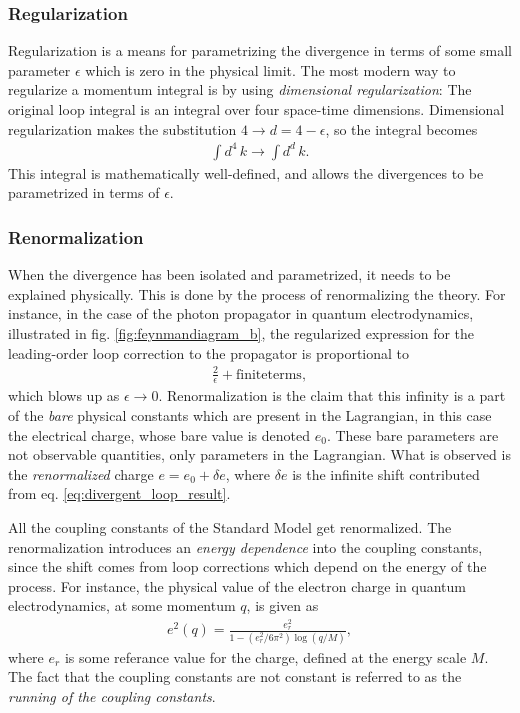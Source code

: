 \subsubsection{Regularization}
Regularization is a means for parametrizing the divergence in terms of some small parameter $\epsilon$ which is zero in the physical limit. The most modern way to regularize a momentum integral is by using {\it dimensional regularization}: The original loop integral is an integral over four space-time dimensions. Dimensional regularization makes the substitution $4 \to d = 4-\epsilon$, so the integral becomes
\begin{align}
	\int d^4 \, k \to \int d^d \, k.
\end{align}
This integral is mathematically well-defined, and allows the divergences to be parametrized in terms of $\epsilon$.
\subsubsection{Renormalization}
When the divergence has been isolated and parametrized, it needs to be explained physically. This is done by the process of renormalizing the theory. For instance, in the case of the photon propagator in quantum electrodynamics, illustrated in fig. \ref{fig:feynmandiagram_b}, the regularized expression for the leading-order loop correction to the propagator is proportional to
\begin{align}
	\frac{2}{\epsilon} + \mathrm{finite terms}, \label{eq:divergent_loop_result}
\end{align}
which blows up as $\epsilon\to 0$. Renormalization is the claim that this infinity is a part of the {\it bare} physical constants which are present in the Lagrangian, in this case the electrical charge, whose bare value is denoted $e_0$. These bare parameters are not observable quantities, only parameters in the Lagrangian. What is observed is the {\it renormalized} charge $e = e_0 + \delta e$, where $\delta e$ is the infinite shift contributed from eq. \eqref{eq:divergent_loop_result}.

All the coupling constants of the Standard Model get renormalized. The renormalization introduces an {\it energy dependence} into the coupling constants, since the shift comes from loop corrections which depend on the energy of the process. For instance, the physical value of the electron charge in quantum electrodynamics, at some momentum $q$, is given as
\begin{align}
	e^2(q) = \frac{e_r^2}{1 - (e_r^2/6\pi^2)\log(q/M)},\label{eq:electron_charge_running}
\end{align}
where $e_r$ is some referance value for the charge, defined at the energy scale $M$. The fact that the coupling constants are not constant is referred to as the {\it running of the coupling constants}.

